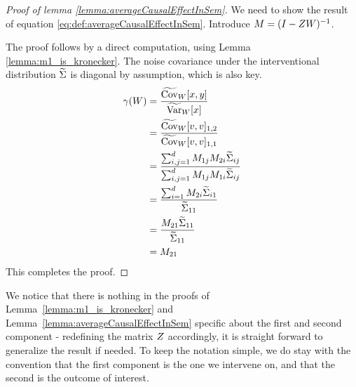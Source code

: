 \begin{proof}[Proof of lemma \ref{lemma:averageCausalEffectInSem}]
We need to show the result of equation \eqref{eq:def:averageCausalEffectInSem}.
Introduce $M = (I-Z W)^{-1}$.

The proof follows by a direct computation, using Lemma \ref{lemma:m1_is_kronecker}. The noise covariance under the interventional distribution $\widetilde {\Sigma}$ is diagonal by assumption, which is also key.
\begin{align}
\gamma(W) 
&= \frac{\widetilde{\text{Cov}}_{W}[x,  y]}{\widetilde{\text{Var}}_{W}[x]} \\
&= \frac{\widetilde{\text{Cov}}_{W}[v,  v]_{1,2}}{\widetilde{\text{Cov}}_{W}[v,  v]_{1,1}} \\
&= \frac{\sum_{i,j=1}^d M_{1j}M_{2i}\widetilde {\Sigma}_{ij}} {\sum_{i,j=1}^d M_{1j}M_{1i}\widetilde {\Sigma}_{ij}} \\ 
&= \frac{\sum_{i=1}^d M_{2i}\widetilde {\Sigma}_{i1}}{\widetilde {\Sigma}_{11}} \\ 
&= \frac{M_{21}\widetilde {\Sigma}_{11}}{\widetilde {\Sigma}_{11}} \\ 
&= M_{21}
\end{align}
This completes the proof.
\end{proof}



 We notice that there is nothing in the proofs of Lemma~\ref{lemma:m1_is_kronecker} and Lemma~\ref{lemma:averageCausalEffectInSem} specific about the first and second component - redefining the matrix $Z$ accordingly, it is straight forward to generalize the result if needed. 
 To keep the notation simple, we do stay with the convention that the first component is the one we intervene on, and that the second is the outcome of interest.






